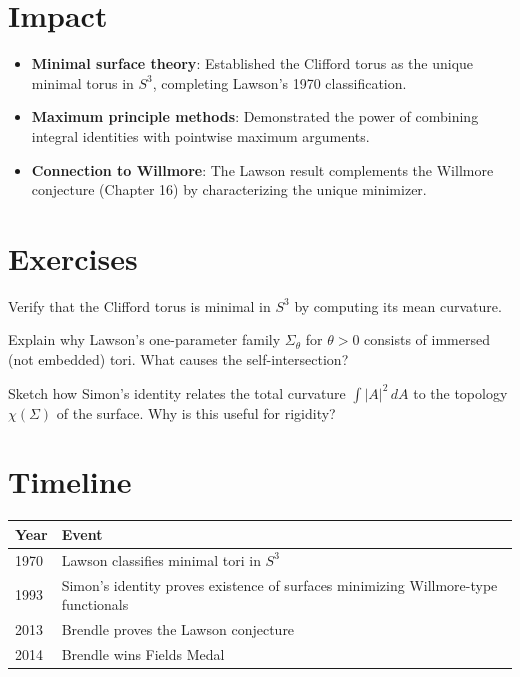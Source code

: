 \section{Impact}
\begin{itemize}
\item \textbf{Minimal surface theory}: Established the Clifford torus as the unique minimal torus in $S^3$, completing Lawson's 1970 classification.
\item \textbf{Maximum principle methods}: Demonstrated the power of combining integral identities with pointwise maximum arguments.
\item \textbf{Connection to Willmore}: The Lawson result complements the Willmore conjecture (Chapter 16) by characterizing the unique minimizer.
\end{itemize}

\section{Exercises}

\begin{exercise}[Basic]
Verify that the Clifford torus is minimal in $S^3$ by computing its mean curvature.
\end{exercise}

\begin{exercise}[Intermediate]
Explain why Lawson's one-parameter family $\Sigma_\theta$ for $\theta > 0$ consists of immersed (not embedded) tori. What causes the self-intersection?
\end{exercise}

\begin{exercise}[Challenge]
Sketch how Simon's identity relates the total curvature $\int |A|^2 \, dA$ to the topology $\chi(\Sigma)$ of the surface. Why is this useful for rigidity?
\end{exercise}

\section{Timeline}

\begin{tabularx}{\linewidth}{lX}
\toprule
\textbf{Year} & \textbf{Event} \\ \midrule
1970 & Lawson classifies minimal tori in $S^3$ \\ 
1993 & Simon's identity proves existence of surfaces minimizing Willmore-type functionals \\
2013 & Brendle proves the Lawson conjecture \\
2014 & Brendle wins Fields Medal \\ \bottomrule
\end{tabularx}

